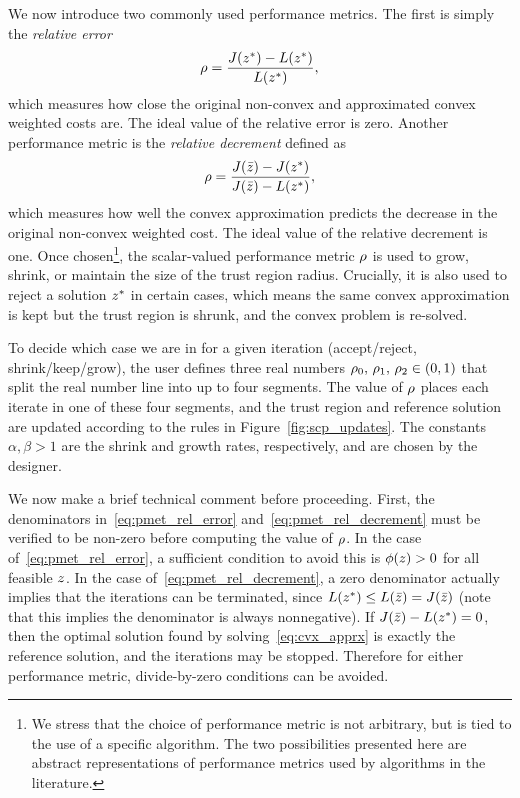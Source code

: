 \documentclass[letterpaper, 10 pt, conference]{ieeeconf}
\begin{document}
We now introduce two commonly used performance metrics. The first is simply the \textit{relative error}
\begin{equation}
\rho = \frac{J(z^*) - L(z^*)}{L(z^*)},
\label{eq:pmet_rel_error}
\end{equation}
which measures how close the original non-convex and approximated convex weighted costs are. The ideal value of the relative error is zero. Another performance metric is the \textit{relative decrement} defined as
\begin{equation}
\rho = \frac{J(\bar{z}) - J(z^*)}{J(\bar{z}) - L(z^*)},
\label{eq:pmet_rel_decrement}
\end{equation}
which measures how well the convex approximation predicts the decrease in the original non-convex weighted cost. The ideal value of the relative decrement is one. Once chosen\footnote{We stress that the choice of performance metric is not arbitrary, but is tied to the use of a specific algorithm. The two possibilities presented here are abstract representations of performance metrics used by algorithms in the literature.}, the scalar-valued performance metric $\rho$ is used to grow, shrink, or maintain the size of the trust region radius. Crucially, it is also used to reject a solution $z^*$ in certain cases, which means the same convex approximation is kept but the trust region is shrunk, and the convex problem is re-solved. 

To decide which case we are in for a given iteration (accept/reject, shrink/keep/grow), the user defines three real numbers $\rho_0,\,\rho_1,\,\rho_2\in(0,1)$ that split the real number line into up to four segments. The value of $\rho$ places each iterate in one of these four segments, and the trust region and reference solution are updated according to the rules in Figure~\ref{fig:scp_updates}. The constants $\alpha,\beta >1$ are the shrink and growth rates, respectively, and are chosen by the designer. 

\begin{figure*}
\centering

\caption{Update rules for two different performance metrics of a general sequential convex programming algorithm.}
\label{fig:scp_updates}
\end{figure*}

We now make a brief technical comment before proceeding. First, the denominators in~\eqref{eq:pmet_rel_error} and~\eqref{eq:pmet_rel_decrement} must be verified to be non-zero before computing the value of $\rho$. In the case of~\eqref{eq:pmet_rel_error}, a sufficient condition to avoid this is $\phi(z)>0$ for all feasible $z$. In the case of~\eqref{eq:pmet_rel_decrement}, a zero denominator actually implies that the iterations can be terminated, since $L(z^*) \leq L(\bar{z}) = J(\bar{z})$ (note that this implies the denominator is always nonnegative). If $J(\bar{z})-L(z^*)=0$, then the optimal solution found by solving~\eqref{eq:cvx_apprx} is exactly the reference solution, and the iterations may be stopped. Therefore for either performance metric, divide-by-zero conditions can be avoided.   
\end{document}
